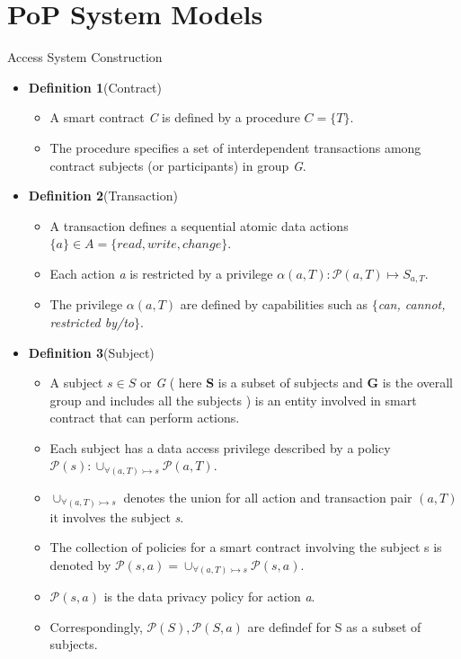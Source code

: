 \documentclass[11pt]{beamer}
\begin{document}
\section{PoP System Models}
\begin{frame}[allowframebreaks]{Access System Construction}
\begin{itemize}
\item \textbf{Definition 1}(Contract)
	\begin{itemize}
	\item A smart contract \textit{C} is defined by a procedure $C = \{T\}$.
	\item The procedure specifies a set of interdependent transactions among contract subjects (or participants) in group \textit{G}.
	\end{itemize}
\item \textbf{Definition 2}(Transaction)
	\begin{itemize}
	\item A transaction defines a sequential atomic data actions $\{a\} \in A = \{\mathit{read,write,change}\}$.
	\item Each action \textit{a} is restricted by a privilege $\alpha(a,T): \mathcal{P}(a,T) \longmapsto S_{a,T}$.
	\item The privilege $\alpha(a, T)$ are defined by capabilities such as $\{$\textit{can, cannot, restricted by/to}$\}$.
	\end{itemize}
\break
\item \textbf{Definition 3}(Subject)
	\begin{itemize}
	\item A subject $s \in S$ or \textit{G} ( here \textbf{S} is a subset of subjects and \textbf{G} is the overall group and includes all the subjects ) is an entity involved in smart contract that can perform actions.
	\item Each subject has a data access privilege described by a policy $\mathcal{P}(s): \cup_{\forall(a, T) \rightarrowtail s} \mathcal{P}(a, T)$.
	\item $\cup_{\forall(a, T) \rightarrowtail s}$ denotes the union for all action and transaction pair $(a, T)$ it involves the subject \textit{s}.
	\item The collection of policies for a smart contract involving the subject s is denoted by $\mathcal{P}(s, a) = \cup_{\forall(a, T) \rightarrowtail s} \mathcal{P}(s, a)$.
	\item $\mathcal{P}(s, a)$ is the data privacy policy for action \textit{a}.
	\item Correspondingly, $\mathcal{P}(S), \mathcal{P}(S, a)$ are defindef for S as a subset of subjects.

\end{itemize}
\end{itemize}
\end{frame}
\end{document}
